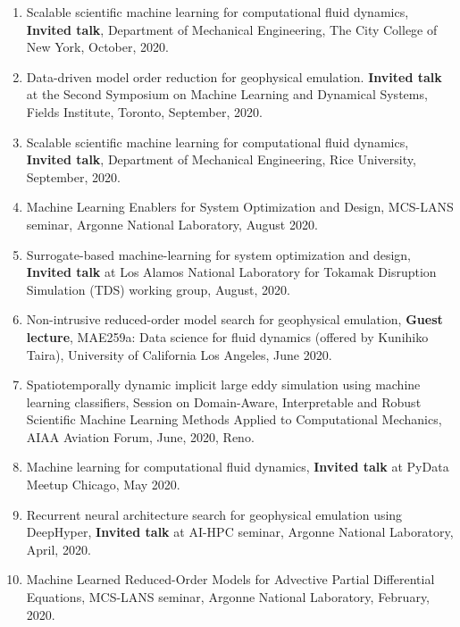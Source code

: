 \documentclass[letterpaper]{article}
\begin{document}
\begin{enumerate}
\item Scalable scientific machine learning for computational fluid dynamics, \textbf{Invited talk}, Department of Mechanical Engineering, The City College of New York, October, 2020.

\item Data-driven model order reduction for geophysical emulation. \textbf{Invited talk} at the Second Symposium on Machine Learning and Dynamical Systems, Fields Institute, Toronto, September, 2020.

\item Scalable scientific machine learning for computational fluid dynamics, \textbf{Invited talk}, Department of Mechanical Engineering, Rice University, September, 2020.

\item Machine Learning Enablers for System Optimization and Design, MCS-LANS seminar, Argonne National Laboratory, August 2020.

\item Surrogate-based machine-learning for system optimization and design, \textbf{Invited talk} at Los Alamos National Laboratory for Tokamak Disruption Simulation (TDS) working group, August, 2020.

\item Non-intrusive reduced-order model search for geophysical emulation, \textbf{Guest lecture}, MAE259a: Data science for fluid dynamics (offered by Kunihiko Taira), University of California Los Angeles, June 2020.

\item Spatiotemporally dynamic implicit large eddy simulation using machine learning classifiers, Session on Domain-Aware, Interpretable and Robust Scientific Machine Learning Methods Applied to Computational Mechanics, AIAA Aviation Forum, June, 2020, Reno. 

\item Machine learning for computational fluid dynamics, \textbf{Invited talk} at PyData Meetup Chicago, May 2020.

\item Recurrent neural architecture search for geophysical emulation using DeepHyper, \textbf{Invited talk} at AI-HPC seminar, Argonne National Laboratory, April, 2020.

\item Machine Learned Reduced-Order Models for Advective Partial Differential Equations, MCS-LANS seminar, Argonne National Laboratory, February, 2020.


\end{enumerate}
\end{document}
